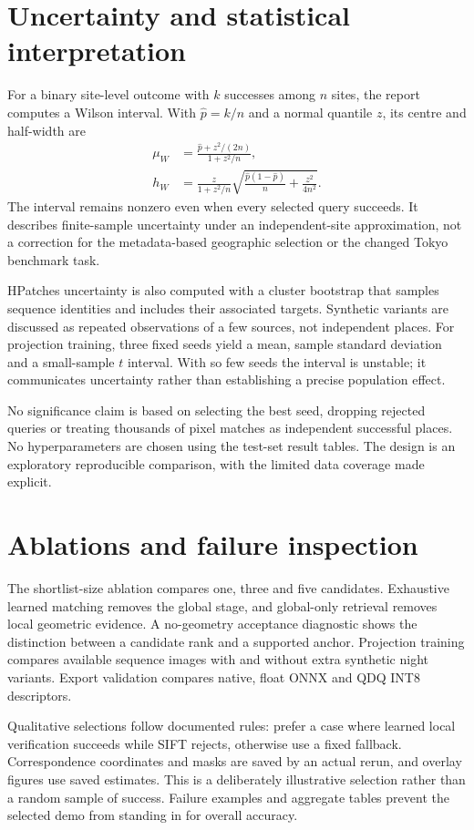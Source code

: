 \section{Uncertainty and statistical interpretation}
For a binary site-level outcome with $k$ successes among $n$ sites, the report computes a Wilson interval. With $\widehat p=k/n$ and a normal quantile $z$, its centre and half-width are
\begin{align}
 \mu_W&=\frac{\widehat p+z^2/(2n)}{1+z^2/n},\\
 h_W&=\frac{z}{1+z^2/n}
 \sqrt{\frac{\widehat p(1-\widehat p)}{n}+\frac{z^2}{4n^2}}.
\end{align}
The interval remains nonzero even when every selected query succeeds. It describes finite-sample uncertainty under an independent-site approximation, not a correction for the metadata-based geographic selection or the changed Tokyo benchmark task.

HPatches uncertainty is also computed with a cluster bootstrap that samples sequence identities and includes their associated targets. Synthetic variants are discussed as repeated observations of a few sources, not independent places. For projection training, three fixed seeds yield a mean, sample standard deviation and a small-sample $t$ interval. With so few seeds the interval is unstable; it communicates uncertainty rather than establishing a precise population effect.

No significance claim is based on selecting the best seed, dropping rejected queries or treating thousands of pixel matches as independent successful places. No hyperparameters are chosen using the test-set result tables. The design is an exploratory reproducible comparison, with the limited data coverage made explicit.

\section{Ablations and failure inspection}
The shortlist-size ablation compares one, three and five candidates. Exhaustive learned matching removes the global stage, and global-only retrieval removes local geometric evidence. A no-geometry acceptance diagnostic shows the distinction between a candidate rank and a supported anchor. Projection training compares available sequence images with and without extra synthetic night variants. Export validation compares native, float ONNX and QDQ INT8 descriptors.

Qualitative selections follow documented rules: prefer a case where learned local verification succeeds while SIFT rejects, otherwise use a fixed fallback. Correspondence coordinates and masks are saved by an actual rerun, and overlay figures use saved estimates. This is a deliberately illustrative selection rather than a random sample of success. Failure examples and aggregate tables prevent the selected demo from standing in for overall accuracy.

